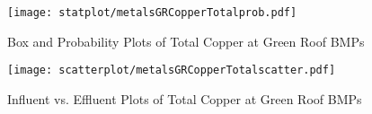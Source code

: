         \begin{figure}[hb]   %
            \centering
            \texttt{[image: statplot/metalsGRCopperTotalprob.pdf]}
            \caption{Box and Probability Plots of Total Copper at Green Roof BMPs}
        \end{figure}         %
        
        
        \begin{figure}[hb]   %
            \centering
            \texttt{[image: scatterplot/metalsGRCopperTotalscatter.pdf]}
            \caption{Influent vs. Effluent Plots of Total Copper at Green Roof BMPs}
        \end{figure}         %
        \clearpage
        
